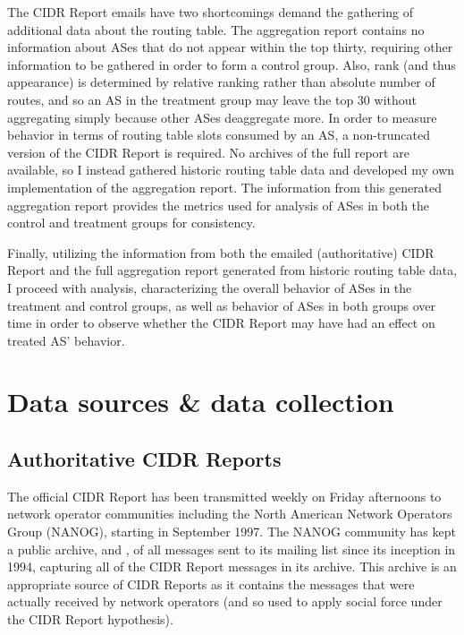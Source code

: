 The CIDR Report emails have two shortcomings demand the gathering of additional data about the routing table. The aggregation report contains no information about ASes that do not appear within the top thirty, requiring other information to be gathered in order to form a control group. Also, rank (and thus appearance) is determined by relative ranking rather than absolute number of routes, and so an AS in the treatment group may leave the top 30 without aggregating simply because other ASes deaggregate more. In order to measure behavior in terms of routing table slots consumed by an AS, a non-truncated version of the CIDR Report is required. No archives of the full report are available, so I instead gathered historic routing table data and developed my own implementation of the aggregation report. The information from this generated aggregation report provides the metrics used for analysis of ASes in both the control and treatment groups for consistency.

Finally, utilizing the information from both the emailed (authoritative) CIDR Report and the full aggregation report generated from historic routing table data, I proceed with analysis, characterizing the overall behavior of ASes in the treatment and control groups, as well as behavior of ASes in both groups over time in order to observe whether the CIDR Report may have had an effect on treated AS' behavior.

\section{Data sources \& data collection} %

\subsection{Authoritative CIDR Reports}

The official CIDR Report has been transmitted weekly on Friday afternoons to network operator communities including the North American Network Operators Group (NANOG), starting in September 1997. The NANOG community has kept a public archive, \cite{NANOG} and \cite{NANOG-new}, of all messages sent to its mailing list since its inception in 1994, capturing all of the CIDR Report messages in its archive. This archive is an appropriate source of CIDR Reports as it contains the messages that were actually received by network operators (and so used to apply social force under the CIDR Report hypothesis).

